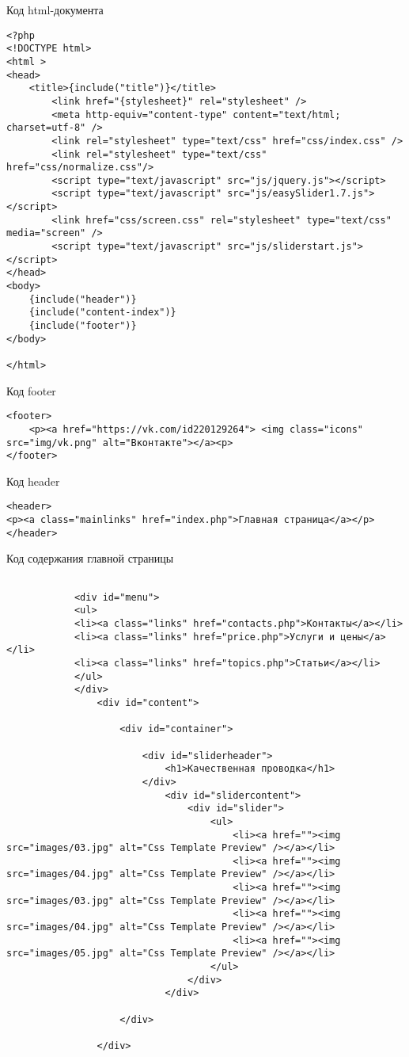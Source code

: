 Код html-документа
\begin{verbatim}
<?php
<!DOCTYPE html>
<html >
<head>
    <title>{include("title")}</title>
		<link href="{stylesheet}" rel="stylesheet" />
		<meta http-equiv="content-type" content="text/html; charset=utf-8" />
		<link rel="stylesheet" type="text/css" href="css/index.css" />
		<link rel="stylesheet" type="text/css" href="css/normalize.css"/>   
		<script type="text/javascript" src="js/jquery.js"></script>
		<script type="text/javascript" src="js/easySlider1.7.js"></script>
		<link href="css/screen.css" rel="stylesheet" type="text/css" media="screen" />	
		<script type="text/javascript" src="js/sliderstart.js"></script>
</head>
<body>
    {include("header")}
    {include("content-index")}
	{include("footer")}
</body>
			
</html>

\end{verbatim}

Код footer
\begin{verbatim}
<footer>
	<p><a href="https://vk.com/id220129264"> <img class="icons"  src="img/vk.png" alt="Вконтакте"></a><p>
</footer>
\end{verbatim}



Код header
\begin{verbatim}
<header>
<p><a class="mainlinks" href="index.php">Главная страница</a></p>
</header>
\end{verbatim}


Код содержания главной страницы
\begin{verbatim}
	
			<div id="menu">
			<ul>
			<li><a class="links" href="contacts.php">Контакты</a></li>
			<li><a class="links" href="price.php">Услуги и цены</a></li>
			<li><a class="links" href="topics.php">Статьи</a></li>
			</ul>
			</div>
				<div id="content">
		
					<div id="container">

						<div id="sliderheader">
							<h1>Качественная проводка</h1>
						</div>
							<div id="slidercontent">
								<div id="slider">
									<ul>				
										<li><a href=""><img src="images/03.jpg" alt="Css Template Preview" /></a></li>
										<li><a href=""><img src="images/04.jpg" alt="Css Template Preview" /></a></li>
										<li><a href=""><img src="images/03.jpg" alt="Css Template Preview" /></a></li>
										<li><a href=""><img src="images/04.jpg" alt="Css Template Preview" /></a></li>
										<li><a href=""><img src="images/05.jpg" alt="Css Template Preview" /></a></li>			
									</ul>
								</div>
							</div>

					</div>

				</div>
\end{verbatim}

